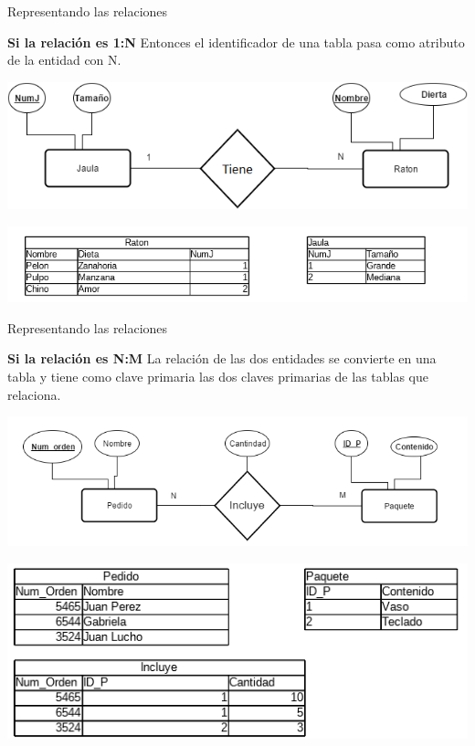 \documentclass[11pt]{beamer}
\begin{document}
\begin{frame}{Representando las relaciones}


 \textbf{Si la relación es 1:N} Entonces el identificador de una tabla pasa como atributo de la entidad con N.

\begin{center}
\includegraphics[scale=.4]{images/1nmmm.png} 
\end{center}
\begin{center}
\includegraphics[scale=.7]{images/1Nmrt.png} 
\end{center}
\end{frame}


\begin{frame}{Representando las relaciones}


 \textbf{Si la relación es N:M} La relación de las dos entidades se convierte en una tabla y tiene como clave primaria las dos claves primarias de las tablas que relaciona.

\begin{center}
\includegraphics[scale=.5]{images/NMmr.png} 
\end{center}
\begin{center}
\includegraphics[scale=.6]{images/nmmrt.png} 
\end{center}
\end{frame}
\end{document}
